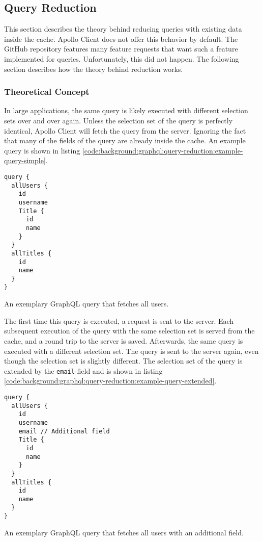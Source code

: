 \subsection{Query Reduction}\label{subsection:background:graphql:query-reduction}

This section describes the theory behind reducing queries with existing data inside the cache. Apollo Client does not offer this behavior by default. The GitHub repository features many feature requests that want such a feature implemented for queries. Unfortunately, this did not happen. The following section describes how the theory behind reduction works.

\subsubsection{Theoretical Concept}\label{subsubsection:background:graphql:theoretical-concept}

In large applications, the same query is likely executed with different selection sets over and over again. Unless the selection set of the query is perfectly identical, Apollo Client will fetch the query from the server. Ignoring the fact that many of the fields of the query are already inside the cache. An example query is shown in listing  \ref{code:background:graphql:query-reduction:example-query-simple}.

\ifshowListings
\begin{listing}[H]
    \begin{verbatim}
query {
  allUsers {
    id
    username
    Title {
      id
      name
    }
  }
  allTitles {
    id
    name
  }
}
    \end{verbatim}
    \caption{An exemplary GraphQL query that fetches all users.}\label{code:background:graphql:query-reduction:example-query-simple}
\end{listing}
\fi

\noindent The first time this query is executed, a request is sent to the server. Each subsequent execution of the query with the same selection set is served from the cache, and a round trip to the server is saved. Afterwards, the same query is executed with a different selection set. The query is sent to the server again, even though the selection set is slightly different. The selection set of the query is extended by the \texttt{email}-field and is shown in listing \ref{code:background:graphql:query-reduction:example-query-extended}.

\ifshowListings
\begin{listing}[H]
    \begin{verbatim}
query {
  allUsers {
    id
    username
    email // Additional field
    Title {
      id
      name
    }
  }
  allTitles {
    id
    name
  }
}
    \end{verbatim}
    \caption{An exemplary GraphQL query that fetches all users with an additional field.}\label{code:background:graphql:query-reduction:example-query-extended}
\end{listing}
\fi

